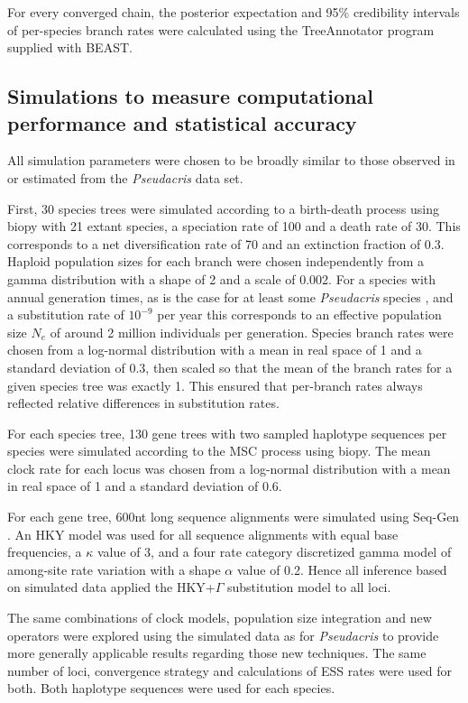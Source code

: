 \documentclass[12pt]{article}
\begin{document}
For every converged chain, the posterior expectation and 95\% credibility
intervals of per-species branch rates were calculated using the TreeAnnotator
program supplied with BEAST.

\subsection{Simulations to measure computational performance and statistical accuracy}

All simulation parameters were chosen to be broadly similar to those observed in
or estimated from the \textit{Pseudacris} data set.

First, 30 species trees were simulated according to a birth-death process
\citep{Gernhard2008769} using biopy with 21 extant species, a speciation rate
of 100 and a death rate of 30. This corresponds to a net diversification rate
of 70 and an extinction fraction of 0.3. Haploid population sizes for each
branch were chosen independently from a gamma distribution with a shape of 2
and a scale of 0.002. For a species with annual generation times, as is the
case for at least some \textit{Pseudacris} species \citep{10.2307/1446044},
and a substitution rate of $10^{-9}$ per year this corresponds to an effective
population size $N_e$ of around 2 million individuals per generation. Species
branch rates were chosen from a log-normal distribution with a mean in real
space of 1 and a standard deviation of 0.3, then scaled so that the mean of
the branch rates for a given species tree was exactly 1. This ensured that
per-branch rates always reflected relative differences in substitution rates.

For each species tree, 130 gene trees with two sampled haplotype sequences per
species were simulated according to the MSC process using biopy. The mean
clock rate for each locus was chosen from a log-normal distribution with a
mean in real space of 1 and a standard deviation of 0.6.

For each gene tree, 600nt long sequence alignments were simulated using Seq-Gen \citep{Rambaut01061997}. An HKY model was used for all sequence alignments
with equal base frequencies, a $\kappa$ value of 3, and a four rate category
discretized gamma model of among-site rate variation with a shape $\alpha$
value of 0.2. Hence all inference based on simulated data applied the HKY+$\Gamma$
substitution model to all loci.

The same combinations of clock models, population size integration and new
operators were explored using the simulated data as for \textit{Pseudacris} to
provide more generally applicable results regarding those new techniques. The
same number of loci, convergence strategy and calculations of ESS rates were
used for both. Both haplotype sequences were used for each species.
\end{document}
